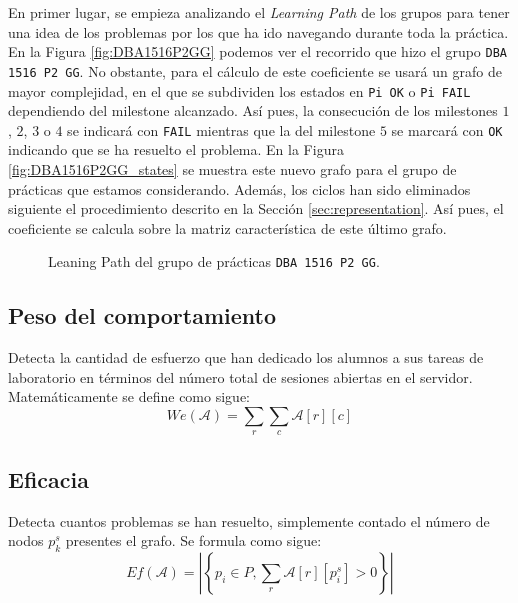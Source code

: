 En primer lugar, se empieza analizando el \emph{Learning Path} de los grupos para tener una idea de los problemas por los que ha ido navegando durante toda la práctica. En la Figura \ref{fig:DBA1516P2GG} podemos ver el recorrido que hizo el grupo \texttt{DBA 1516 P2 GG}. No obstante, para el cálculo de este coeficiente se usará un grafo de mayor complejidad, en el que se subdividen los estados en \texttt{Pi OK} o \texttt{Pi FAIL} dependiendo del milestone alcanzado. Así pues, la consecución de los milestones $1$, $2$, $3$ o $4$ se indicará con \texttt{FAIL} mientras que la del milestone $5$ se marcará con \texttt{OK} indicando que se ha resuelto el problema. En la Figura \ref{fig:DBA1516P2GG_states} se muestra este nuevo grafo para el grupo de prácticas que estamos considerando. Además, los ciclos han sido eliminados siguiente el procedimiento descrito en la Sección \ref{sec:representation}. Así pues, el coeficiente se calcula sobre la matriz característica de este último grafo.

\begin{figure}[H]
\centering
{}\qquad
{}
\caption{Leaning Path del grupo de prácticas \texttt{DBA 1516 P2 GG}.}
\label{fig:laplacian}
\end{figure}

\subsection{Peso del comportamiento}
Detecta la cantidad de esfuerzo que han dedicado los alumnos a sus tareas de laboratorio en términos del número total de sesiones abiertas en el servidor. Matemáticamente se define como sigue:
\begin{equation}
We(\mathcal{A}) = \sum_r \sum_c \mathcal{A}[r][c]
\end{equation}
\subsection{Eficacia}
Detecta cuantos problemas se han resuelto, simplemente contado el número de nodos $p_k^s$ presentes el grafo. Se formula como sigue:
\begin{equation}
Ef(\mathcal{A}) = \left|\left\lbrace p_i \in P, \sum_r \mathcal{A}[r][p_i^s] > 0 \right\rbrace\right|
\end{equation}
